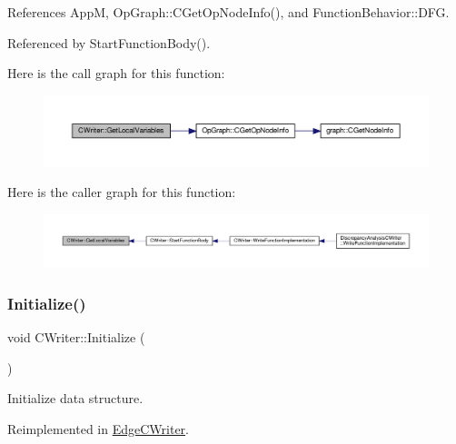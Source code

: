 References AppM, Op\+Graph\+::\+C\+Get\+Op\+Node\+Info(), and Function\+Behavior\+::\+D\+FG.



Referenced by Start\+Function\+Body().

Here is the call graph for this function\+:
\nopagebreak
\begin{figure}[H]
\begin{center}
\leavevmode
\includegraphics[width=350pt]{d3/d59/classCWriter_aad06f4f569e3a651b401c963b1dcada8_cgraph}
\end{center}
\end{figure}
Here is the caller graph for this function\+:
\nopagebreak
\begin{figure}[H]
\begin{center}
\leavevmode
\includegraphics[width=350pt]{d3/d59/classCWriter_aad06f4f569e3a651b401c963b1dcada8_icgraph}
\end{center}
\end{figure}
\mbox{\label{classCWriter_a7b57fdc8a06f368a65c03af147834198}} 
\subsubsection{\texorpdfstring{Initialize()}{Initialize()}}
{\footnotesize\ttfamily void C\+Writer\+::\+Initialize (\begin{DoxyParamCaption}{ }\end{DoxyParamCaption})\hspace{0.3cm}{\ttfamily [virtual]}}



Initialize data structure. 



Reimplemented in \hyperlink{classEdgeCWriter_a514808888307cd604ce3b453b550c6a3}{Edge\+C\+Writer}.



